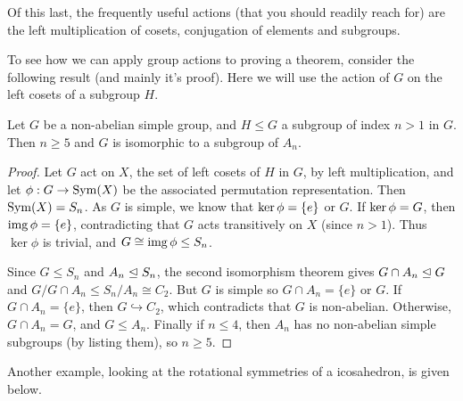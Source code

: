 \documentclass[a4paper]{scrreprt}
\begin{document}
Of this last, the frequently useful actions (that you should readily reach for) are the left multiplication of cosets, conjugation of elements and subgroups.


To see how we can apply group actions to proving a theorem, consider the following result (and mainly it's proof). Here we will use the action of $G$ on the left cosets of a subgroup $H$.

\begin{theorem}
	Let $G$ be a non-abelian simple group, and $H\leq G$ a subgroup of index $n > 1$ in $G$. Then $n \geq 5$ and $G$ is isomorphic to a subgroup of $A_n$.
\end{theorem}
\begin{proof}
	Let $G$ act on $X$, the set of left cosets of $H$ in $G$, by left multiplication, and let $\phi: G \rightarrow \operatorname{Sym}(X)$ be the associated permutation representation. Then $\operatorname{Sym}(X) = S_n$. As $G$ is simple, we know that $\operatorname{ker} \phi = \{e\}$ or $G$. If $\operatorname{ker} \phi = G$, then $\operatorname{img} \phi = \{e\}$, contradicting that $G$ acts transitively on $X$ (since $n > 1$). Thus $\ker \phi$ is trivial, and $G \cong \operatorname{img} \phi \leq S_n$.

	Since $G \leq S_n$ and $A_n \trianglelefteq S_n$, the second isomorphism theorem gives $G \cap A_n \trianglelefteq G$ and $G / G \cap A_n \leq S_n / A_n \cong C_2$. But $G$ is simple so $G \cap A_n = \{e\}$ or $G$. If $G \cap A_n = \{e\}$, then $G \hookrightarrow C_2$, which contradicts that $G$ is non-abelian. Otherwise, $G \cap A_n = G$, and $G \leq A_n$. Finally if $n \leq 4$, then $A_n$ has no non-abelian simple subgroups (by listing them), so $n \geq 5$.
\end{proof}

Another example, looking at the rotational symmetries of a icosahedron, is given below.
\end{document}
